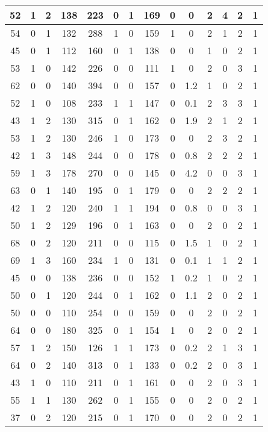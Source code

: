 \documentclass{article}
\begin{document}
\begin{longtable}{|c|c|c|c|c|c|c|c|c|c|c|c|c|c|}
\hline
52 & 1 & 2 & 138 & 223 & 0 & 1 & 169 & 0 & 0 & 2 & 4 & 2 & 1\\
\hline
54 & 0 & 1 & 132 & 288 & 1 & 0 & 159 & 1 & 0 & 2 & 1 & 2 & 1\\
\hline
45 & 0 & 1 & 112 & 160 & 0 & 1 & 138 & 0 & 0 & 1 & 0 & 2 & 1\\
\hline
53 & 1 & 0 & 142 & 226 & 0 & 0 & 111 & 1 & 0 & 2 & 0 & 3 & 1\\
\hline
62 & 0 & 0 & 140 & 394 & 0 & 0 & 157 & 0 & 1.2 & 1 & 0 & 2 & 1\\
\hline
52 & 1 & 0 & 108 & 233 & 1 & 1 & 147 & 0 & 0.1 & 2 & 3 & 3 & 1\\
\hline
43 & 1 & 2 & 130 & 315 & 0 & 1 & 162 & 0 & 1.9 & 2 & 1 & 2 & 1\\
\hline
53 & 1 & 2 & 130 & 246 & 1 & 0 & 173 & 0 & 0 & 2 & 3 & 2 & 1\\
\hline
42 & 1 & 3 & 148 & 244 & 0 & 0 & 178 & 0 & 0.8 & 2 & 2 & 2 & 1\\
\hline
59 & 1 & 3 & 178 & 270 & 0 & 0 & 145 & 0 & 4.2 & 0 & 0 & 3 & 1\\
\hline
63 & 0 & 1 & 140 & 195 & 0 & 1 & 179 & 0 & 0 & 2 & 2 & 2 & 1\\
\hline
42 & 1 & 2 & 120 & 240 & 1 & 1 & 194 & 0 & 0.8 & 0 & 0 & 3 & 1\\
\hline
50 & 1 & 2 & 129 & 196 & 0 & 1 & 163 & 0 & 0 & 2 & 0 & 2 & 1\\
\hline
68 & 0 & 2 & 120 & 211 & 0 & 0 & 115 & 0 & 1.5 & 1 & 0 & 2 & 1\\
\hline
69 & 1 & 3 & 160 & 234 & 1 & 0 & 131 & 0 & 0.1 & 1 & 1 & 2 & 1\\
\hline
45 & 0 & 0 & 138 & 236 & 0 & 0 & 152 & 1 & 0.2 & 1 & 0 & 2 & 1\\
\hline
50 & 0 & 1 & 120 & 244 & 0 & 1 & 162 & 0 & 1.1 & 2 & 0 & 2 & 1\\
\hline
50 & 0 & 0 & 110 & 254 & 0 & 0 & 159 & 0 & 0 & 2 & 0 & 2 & 1\\
\hline
64 & 0 & 0 & 180 & 325 & 0 & 1 & 154 & 1 & 0 & 2 & 0 & 2 & 1\\
\hline
57 & 1 & 2 & 150 & 126 & 1 & 1 & 173 & 0 & 0.2 & 2 & 1 & 3 & 1\\
\hline
64 & 0 & 2 & 140 & 313 & 0 & 1 & 133 & 0 & 0.2 & 2 & 0 & 3 & 1\\
\hline
43 & 1 & 0 & 110 & 211 & 0 & 1 & 161 & 0 & 0 & 2 & 0 & 3 & 1\\
\hline
55 & 1 & 1 & 130 & 262 & 0 & 1 & 155 & 0 & 0 & 2 & 0 & 2 & 1\\
\hline
37 & 0 & 2 & 120 & 215 & 0 & 1 & 170 & 0 & 0 & 2 & 0 & 2 & 1\\

\end{longtable}
\end{document}
